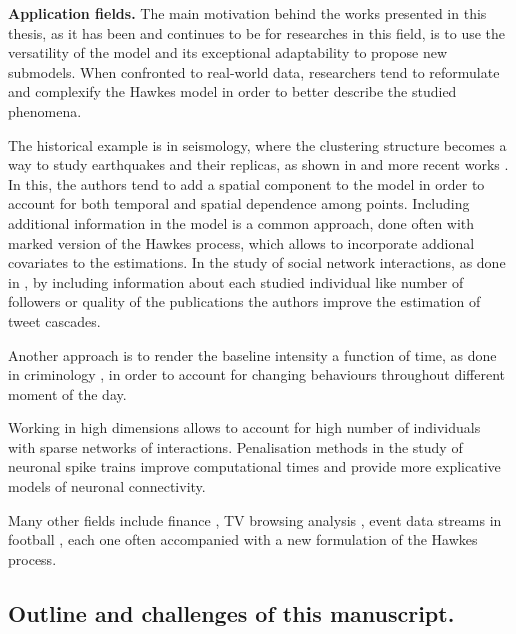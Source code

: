     \textbf{Application fields.}
    The main motivation behind the works presented in this thesis, as it has been and continues to be for researches in this field,
    is to use the versatility of the model and its exceptional adaptability to propose new submodels.
    When confronted to real-world data, 
    researchers tend to reformulate and complexify the Hawkes model in order to better describe the studied phenomena. 
    
    The historical example is in seismology, 
    where the clustering structure becomes a way to study earthquakes and their replicas, as shown in \textcite{Adamopoulos1976,Ogata1988, Ogata1998} and more recent works \parencite{Kwon2023}.
    In this, the authors tend to add a spatial component to the model in order to account for both temporal and spatial dependence among points.
    Including additional information in the model is a common approach, done often with marked version of the Hawkes process,
    which allows to incorporate addional covariates to the estimations. 
    In the study of social network interactions, as done in \textcite{Mishra2016,Rizoiu2017},
    by including information about each studied individual like number of followers or quality of the publications the authors improve the estimation of tweet cascades.

    Another approach is to render the baseline intensity a function of time, 
    as done in criminology \textcite{Lewis2011, Olinde2020}, 
    in order to account for changing behaviours throughout different moment of the day.

    Working in high dimensions allows to account for high number of individuals with sparse networks of interactions.
    Penalisation methods in the study of neuronal spike trains \parencite{Reynaud2013, Lambert2018}
    improve computational times and provide more explicative models of neuronal connectivity.

    Many other fields include finance \parencite{Embrechts2011, Bacry2013, Lotz2024}, TV browsing analysis \parencite{Xu2016}, event data streams in football \parencite{Baouan2023, Narayanan2023}, 
    each one often accompanied with a new formulation of the Hawkes process.

    \subsection{Outline and challenges of this manuscript.}\label{sec:chap0_outline}

